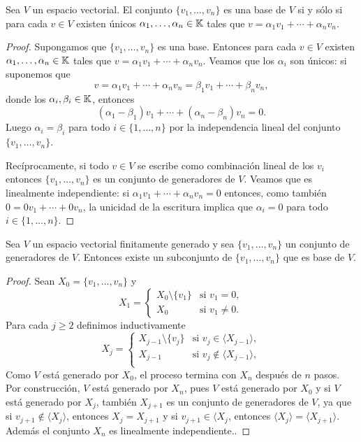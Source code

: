 \begin{prop}
    Sea $V$ un espacio vectorial. El conjunto $\{v_1,\dots,v_n\}$ es una base
    de $V$ si y sólo si para cada $v\in V$ existen únicos
    $\alpha_1,\dots,\alpha_n\in\mathbb{K}$ tales que $v=\alpha_1v_1+\cdots+\alpha_n
    v_n$.

	\begin{proof}
		Supongamos que $\{v_1,\dots,v_n\}$ es una base. Entonces para cada
		$v\in V$ existen $\alpha_1,\dots,\alpha_n\in\mathbb{K}$ tales que
		$v=\alpha_1v_1+\cdots+\alpha_n v_n$. Veamos que los $\alpha_i$ son
		únicos: si suponemos que \[
            v=\alpha_1v_1+\cdots+\alpha_nv_n=\beta_1v_1+\cdots+\beta_n v_n,
        \]
		donde los $\alpha_i,\beta_i\in\mathbb{K}$, entonces
		\[
			(\alpha_1-\beta_1)v_1+\cdots+(\alpha_n-\beta_n)v_n=0.
		\]
		Luego $\alpha_i=\beta_i$ para todo $i\in\{1,\dots,n\}$ por la
		independencia lineal del conjunto $\{v_1,\dots,v_n\}$.

		Recíprocamente, si todo $v\in V$ se escribe como combinación lineal de
		los $v_i$ entonces $\{v_1,\dots,v_n\}$ es un conjunto de generadores de
		$V$. Veamos que es linealmente independiente: si
		$\alpha_1v_1+\cdots+\alpha_nv_n=0$ entonces, como también
		$0=0v_1+\cdots+0v_n$, la unicidad de la escritura implica que
		$\alpha_i=0$ para todo $i\in\{1,\dots,n\}$.
	\end{proof}
\end{prop}

\begin{prop}
	\label{pro:extraer_una_base}
    Sea $V$ un espacio vectorial finitamente generado y sea $\{v_1,\dots,v_n\}$
    un conjunto de generadores de $V$.  Entonces existe un subconjunto de
    $\{v_{1},\dots,v_{n}\}$ que es base de $V$.

	\begin{proof}
		Sean $X_0=\{v_1,\dots,v_n\}$ y 
		\[
			X_1=\begin{cases}
				X_0\setminus\{v_1\} & \text{si $v_1=0$},\\
				X_0 & \text{si $v_1\ne0$}.
			\end{cases}
		\]
		Para cada $j\geq2$ definimos inductivamente
		\[
			X_j=\begin{cases}
				X_{j-1}\setminus\{v_j\} & \text{si $v_j\in\langle X_{j-1}\rangle$},\\
				X_{j-1} & \text{si $v_j\not\in\langle X_{j-1}\rangle$},\\
			\end{cases}
		\]
		Como $V$ está generado por $X_0$, el proceso termina con $X_n$ después
		de $n$ pasos. Por construcción, $V$ está generado por $X_n$, pues 
		$V$ está generado por $X_0$ y si $V$ está generado por $X_j$, también $X_{j+1}$ es un conjunto de generadores
		de $V$, ya que si $v_{j+1}\not\in \langle X_j\rangle$, entonces $X_j=X_{j+1}$ y si $v_{j+1}\in \langle X_{j}$, 
		entonces $\langle X_j\rangle=\langle X_{j+1}\rangle$. Además 
		el conjunto $X_n$ es linealmente
		independiente..
	\end{proof}
\end{prop}

